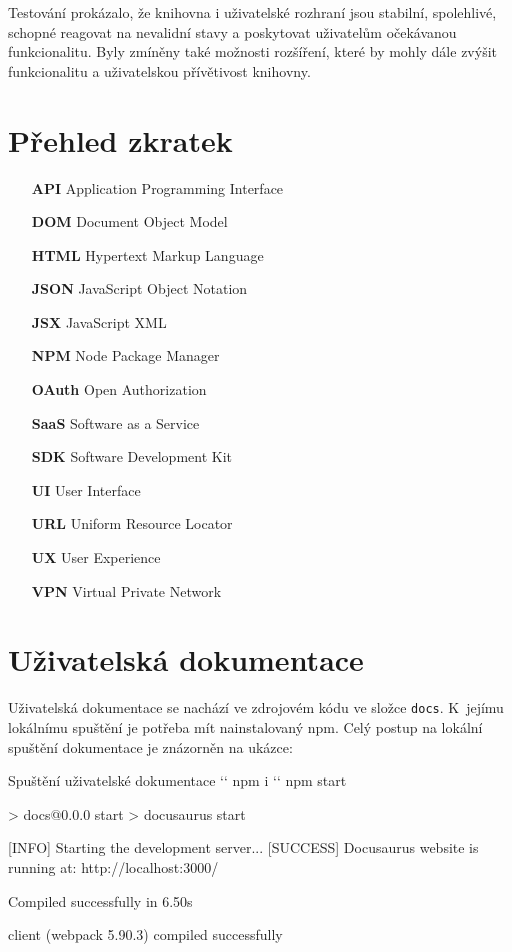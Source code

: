 \documentclass[czech, bc, kiv, he, iso690numb]{fasthesis}
\begin{document}
Testování prokázalo, že knihovna i uživatelské rozhraní jsou stabilní, spolehlivé, schopné reagovat na nevalidní stavy a poskytovat uživatelům očekávanou funkcionalitu. Byly zmíněny 
také možnosti rozšíření, které by mohly dále zvýšit funkcionalitu a uživatelskou přívětivost knihovny.

\chapter*{Přehled zkratek}

\begin{itemize}[align=left, labelwidth=1.5cm, labelsep=10pt, leftmargin=!]
    \item[\textbf{API}]    Application Programming Interface  
    \item[\textbf{DOM}] 	Document Object Model
    \item[\textbf{HTML}]  Hypertext Markup Language
    \item[\textbf{JSON}]  JavaScript Object Notation
    \item[\textbf{JSX}] JavaScript XML
    \item[\textbf{NPM}] Node Package Manager
    \item[\textbf{OAuth}] Open Authorization
    \item[\textbf{SaaS}]  Software as a Service
    \item[\textbf{SDK}]    Software Development Kit
    \item[\textbf{UI}]        User Interface
    \item[\textbf{URL}] Uniform Resource Locator
    \item[\textbf{UX}]        User Experience
    \item[\textbf{VPN}]        Virtual Private Network
\end{itemize}

\appendix
\chapter{Uživatelská dokumentace}\label{app:docuDocs}
Uživatelská dokumentace se nachází ve zdrojovém kódu ve složce \texttt{docs}. K~jejímu lokálnímu spuštění je potřeba mít nainstalovaný npm.
Celý postup na lokální spuštění dokumentace je znázorněn na ukázce:

\begin{console}{Spuštění uživatelské dokumentace}
`\winprompt` npm i
`\winprompt` npm start

> docs@0.0.0 start
> docusaurus start

[INFO] Starting the development server...
[SUCCESS] Docusaurus website is running at: http://localhost:3000/

 Compiled successfully in 6.50s

client (webpack 5.90.3) compiled successfully
\end{console}
\end{document}
